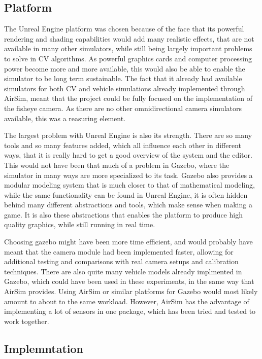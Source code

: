 \subsection{Platform}

The Unreal Engine platform was chosen because of the face that its powerful rendering and shading capabilities would add many realistic effects, that are not available in many other simulators, while still being largely important problems to solve in CV algorithms. As powerful graphics cards and computer processing power become more and more available, this would also be able to enable the simulator to be long term sustainable. The fact that it already had available simulators for both CV and vehicle simulations already implemented through AirSim, meant that the project could be fully focused on the implementation of the fisheye camera. As there are no other omnidirectional camera simulators available, this was a reasuring element.

The largest problem with Unreal Engine is also its strength. There are so many tools and so many features added, which all influence each other in different ways, that it is really hard to get a good overview of the system and the editor. This would not have been that much of a problem in Gazebo, where the simulator in many ways are more specialized to its task. Gazebo also provides a modular modeling system that is much closer to that of mathematical modeling, while the same functionality can be found in Unreal Engine, it is often hidden behind many different abstractions and tools, which make sense when making a game. It is also these abstractions that enables the platform to produce high quality graphics, while still running in real time.

Choosing gazebo might have been more time efficient, and would probably have meant that the camera module had been implemented faster, allowing for additional testing and comparisons with real camera setups and calibration techniques. There are also quite many vehicle models already implmented in Gazebo, which could have been used in these experiments, in the same way that AirSim provides. Using AirSim or similar platforms for Gazebo would most likely amount to about to the same workload. However, AirSim has the advantage of implementing a lot of sensors in one package, which has been tried and tested to work together.

\subsection{Implemntation}

